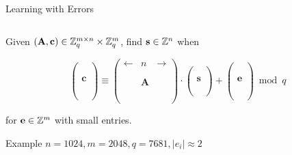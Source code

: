 \documentclass[xcolor=table,10pt,aspectratio=169]{beamer}
\renewcommand{\vec}[1]{\ensuremath{\mathbf{#1}}\xspace}
\providecommand{\mat}[1]{\ensuremath{\vec{#1}}\xspace}
\begin{document}
\begin{frame}[label={sec:orgf2ee475}]{Learning with Errors}
\begin{columns}
\begin{column}[t]{0.6\columnwidth}
Given \((\mat{A},\vec{c}) \in \ZZ_{q}^{m \times n} \times \ZZ_{q}^{m}\), find \(\vec{s}  \in \ZZ^{n}\) when

\[
\left(\begin{array}{c} \\ \\ \\ \vec{c}\\ \\ \\ \\ \end{array} \right)
\equiv \left(\begin{array}{ccc}
\leftarrow & n & \rightarrow \\ \\ \\ 
& \mathbf{A} & \\
\\ \\ \\
\end{array} \right)
\cdot \left(\begin{array}{c} \\ \\ \vec{s}\\ \\ \\ \end{array} \right)
+ \left(\begin{array}{c} \\ \\ \\ \vec{e}\\ \\ \\ \\\end{array}\right)
\bmod q
\]

for \(\vec{e} \in \ZZ^{m}\) with small entries.

\begin{alertblock}{Example}
\(n = 1024, m=2048, q=7681, |e_{i}| \approx 2\)
\end{alertblock}
\end{column}


\end{columns}
\end{frame}
\end{document}
